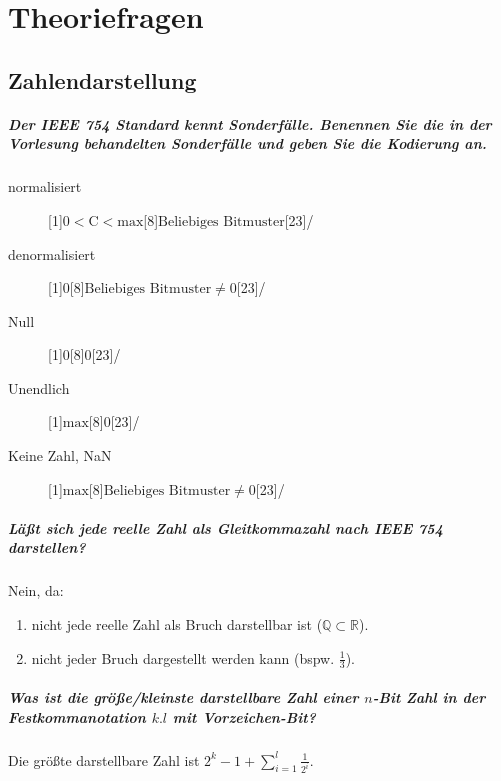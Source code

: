 \documentclass[a4paper, 11pt, accentcolor = tud3b]{tudreport}
\begin{document}
    \chapter{Theoriefragen}
        \section{Zahlendarstellung}
            \paragraph{Der IEEE 754 Standard kennt Sonderfälle. Benennen Sie die in der Vorlesung behandelten Sonderfälle und geben Sie die Kodierung an.}
                \begin{description}
                    \item[normalisiert]    \bitpattern[startBit = 31, noBitNumbers]{$ \pm $}[1]{$ 0 < \text{C} < \text{max} $}[8]{$ \text{Beliebiges Bitmuster} $}[23]/
                    \item[denormalisiert]  \bitpattern[startBit = 31, noBitNumbers]{$ \pm $}[1]{$ 0 $}[8]{$ \text{Beliebiges Bitmuster} \neq 0 $}[23]/
                    \item[Null]            \bitpattern[startBit = 31, noBitNumbers]{$ \pm $}[1]{$ 0 $}[8]{$ 0 $}[23]/
                    \item[Unendlich]       \bitpattern[startBit = 31, noBitNumbers]{$ \pm $}[1]{$ \text{max} $}[8]{$ 0 $}[23]/
                    \item[Keine Zahl, NaN] \bitpattern[startBit = 31, noBitNumbers]{$ \pm $}[1]{$ \text{max} $}[8]{$ \text{Beliebiges Bitmuster} \neq 0 $}[23]/
                \end{description}

            \paragraph{Läßt sich jede reelle Zahl als Gleitkommazahl nach IEEE 754 darstellen?}
                Nein, da:
                \begin{enumerate}
                    \item nicht jede reelle Zahl als Bruch darstellbar ist ($ \mathbb{Q} \subset \mathbb{R} $).
                    \item nicht jeder Bruch dargestellt werden kann (bspw. $ \frac{1}{3} $).
                \end{enumerate}

            \paragraph{Was ist die größe/kleinste darstellbare Zahl einer $ n $-Bit Zahl in der Festkommanotation $ k.l $ mit Vorzeichen-Bit?}
                Die größte darstellbare Zahl ist $ 2 ^ k - 1 + \sum _ { i = 1 } ^ { l } \frac{1}{2 ^ i} $.
\end{document}
